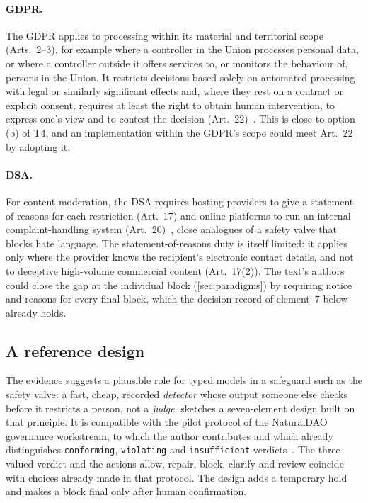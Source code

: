 \paragraph{GDPR.}
The GDPR applies to processing within its material and territorial scope (Arts.~2--3), for example where a controller in the Union processes personal data, or where a controller outside it offers services to, or monitors the behaviour of, persons in the Union.
It restricts decisions based solely on automated processing with legal or similarly significant effects and, where they rest on a contract or explicit consent, requires at least the right to obtain human intervention, to express one's view and to contest the decision (Art.~22)~\cite{gdpr2016}.
This is close to option (b) of T4, and an implementation within the GDPR's scope could meet Art.~22 by adopting it.

\paragraph{DSA.}
For content moderation, the DSA requires hosting providers to give a statement of reasons for each restriction (Art.~17) and online platforms to run an internal complaint-handling system (Art.~20)~\cite{dsa2022}, close analogues of a safety valve that blocks hate language.
The statement-of-reasons duty is itself limited: it applies only where the provider knows the recipient's electronic contact details, and not to deceptive high-volume commercial content (Art.~17(2)).
The text's authors could close the gap at the individual block (\cref{sec:paradigms}) by requiring notice and reasons for every final block, which the decision record of element~7 below already holds.

\subsection{A reference design}
\label{sec:design}

The evidence suggests a plausible role for typed models in a safeguard such as the \pol{} safety valve: a fast, cheap, recorded \emph{detector} whose output someone else checks before it restricts a person, not a \emph{judge}.
 sketches a seven-element design built on that principle.
It is compatible with the pilot protocol of the NaturalDAO governance workstream, to which the author contributes and which already distinguishes \texttt{conforming}, \texttt{violating} and \texttt{insufficient} verdicts~\cite{polgov}.
The three-valued verdict and the actions allow, repair, block, clarify and review coincide with choices already made in that protocol. The design adds a temporary hold and makes a block final only after human confirmation.

